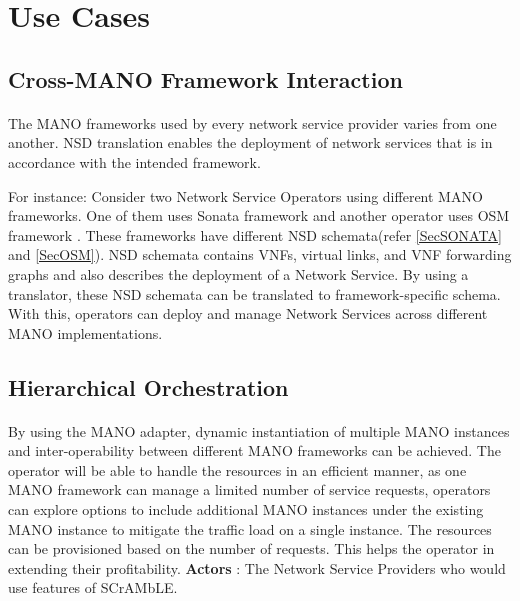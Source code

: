 \newpage
\section{Use Cases}

\subsection{Cross-MANO Framework Interaction}
\paragraph{}

The MANO frameworks used by every network service provider varies from one another. NSD translation enables the deployment of network services that is in accordance with the intended framework.

For instance: Consider two Network Service Operators using different MANO frameworks. One of them uses Sonata framework \cite{draxler2017sonata} and another operator uses OSM framework \cite{ersue2013etsi}. These frameworks have different NSD schemata(refer \ref{SecSONATA} and \ref{SecOSM}). NSD schemata contains VNFs, virtual links, and VNF forwarding graphs and also describes the deployment of a Network Service. By using a translator, these NSD schemata can be translated to framework-specific schema. With this, operators can deploy and manage Network Services across different MANO implementations.

\subsection{Hierarchical Orchestration}
\paragraph{}
By using the MANO adapter, dynamic instantiation of multiple MANO instances and inter-operability between different MANO frameworks can be achieved. The operator will be able to handle the resources in an efficient manner, as one MANO framework can manage a limited number of service requests, operators can explore options to include additional MANO instances under the existing MANO instance to mitigate the traffic load on a single instance. The resources can be provisioned based on the number of requests. This helps the operator in extending their profitability.
\newpage
\textbf{Actors} : The Network Service Providers who would use features of SCrAMbLE.

